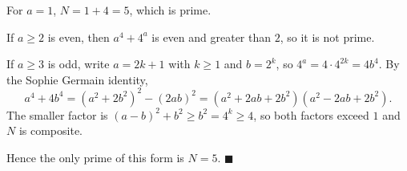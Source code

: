 For $a=1$, $N=1+4=5$, which is prime.

If $a\ge2$ is even, then $a^4+4^a$ is even and greater than $2$, so it is not prime.

If $a\ge3$ is odd, write $a=2k+1$ with $k\ge1$ and $b=2^k$, so $4^a=4\cdot4^{2k}=4b^4$. By the Sophie Germain identity,
\[a^4+4b^4=\left(a^2+2b^2\right)^2-(2ab)^2=\left(a^2+2ab+2b^2\right)\left(a^2-2ab+2b^2\right).\]
The smaller factor is $(a-b)^2+b^2\ge b^2=4^k\ge4$, so both factors exceed $1$ and $N$ is composite.

Hence the only prime of this form is $N=\boxed{5}$. $\blacksquare$

